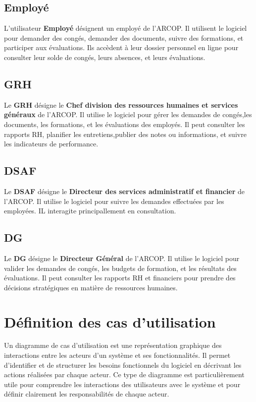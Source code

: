 \subsection{Employé}
L'utilisateur \textbf{Employé} désignent un employé de l'ARCOP. Il utilisent le logiciel pour demander des congés, demander des documents, suivre des formations, et participer aux évaluations. Ils accèdent à leur dossier personnel en ligne pour consulter leur solde de congés, leurs absences, et leurs évaluations.
\subsection{GRH}
Le \textbf{GRH} désigne le \textbf{Chef division des ressources humaines et services généraux} de l'ARCOP. Il utilise le logiciel pour gérer les demandes de congés,les documents, les formations, et les évaluations des employés. Il peut consulter les rapports RH, planifier les entretiens,publier des notes ou informations, et suivre les indicateurs de performance.
\subsection{DSAF }
Le \textbf{DSAF} désigne le \textbf{ Directeur des services administratif et financier} de l'ARCOP. Il utilise le logiciel pour suivre les demandes effectuées par les employées. IL interagite principallement en consultation.
\subsection{DG}
Le \textbf{DG} désigne le \textbf{Directeur Général} de l'ARCOP. Il utilise le logiciel pour valider les demandes de congés, les budgets de formation, et les résultats des évaluations. Il peut consulter les rapports RH et financiers pour prendre des décisions stratégiques en matière de ressources humaines.


\section{D\'efinition des cas d'utilisation}

Un diagramme de cas d'utilisation est une représentation graphique des interactions entre les acteurs d'un système et ses fonctionnalités. Il permet d'identifier et de structurer les besoins fonctionnels du logiciel en décrivant les actions réalisées par chaque acteur. Ce type de diagramme est particulièrement utile pour comprendre les interactions des utilisateurs avec le système et pour définir clairement les responsabilités de chaque acteur.

